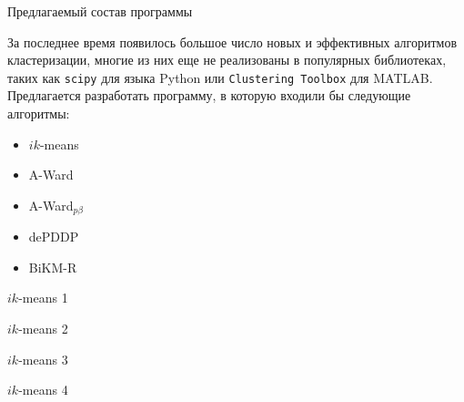 \documentclass[aspectratio=169]{beamer}
\newcommand{\AWard}{\mbox{A-Ward}\xspace}
\newcommand{\AWardpb}{\mbox{A-Ward$ _{p\beta} $}\xspace}
\newcommand{\BiKMR}{\mbox{BiKM-R}\xspace}
\newcommand{\dePDDP}{dePDDP\xspace}
\newcommand{\ikmeans}{\mbox{$ ik $-means}\xspace}
\begin{document}
	\begin{frame}{Предлагаемый состав программы}

		\parbox{\linewidth}{За последнее время появилось большое число новых и эффективных алгоритмов кластеризации, многие из них еще не реализованы в популярных библиотеках, таких как \texttt{scipy} для языка Python или  \texttt{Clustering Toolbox} для MATLAB. Предлагается разработать программу, в которую входили бы следующие алгоритмы:}
		
       	\begin{itemize}
       		\item \ikmeans
       		\item \AWard
       		\item \AWardpb
       		\item \dePDDP
	       	\item \BiKMR
       	\end{itemize}
	
	\end{frame}

	\begin{frame}{\ikmeans 1}
			\begin{figure} %
				\centering
				
			\end{figure}
	\end{frame}
	
	
	\begin{frame}{\ikmeans 2}
		\begin{figure} %
			\centering
			
		\end{figure}
	\end{frame}
	
	
	\begin{frame}{\ikmeans 3}
		\begin{figure} %
			\centering
			
		\end{figure}
	\end{frame}
	
	
	\begin{frame}{\ikmeans 4}
		\begin{figure} %
			\centering
			
		\end{figure}
	\end{frame}
		
\end{document}
